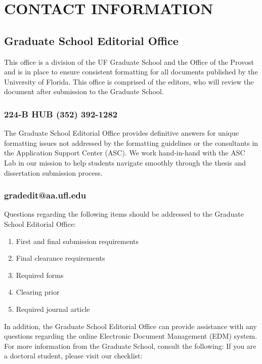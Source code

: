 \chapter{CONTACT INFORMATION}%

\section{Graduate School Editorial Office}%
This office is a division of the UF Graduate School and the Office of the Provost and is in place to ensure consistent formatting for all documents published by the University of Florida. This office is comprised of the editors, who will review the document after submission to the Graduate School. \cite{Bailey}
\subsection{224-B HUB (352) 392-1282}
The Graduate School Editorial Office provides definitive answers for unique formatting issues not addressed by the formatting guidelines or the consultants in the Application Support Center (ASC). We work hand-in-hand with the ASC Lab in our mission to help students navigate smoothly through the thesis and dissertation submission process. 
\subsection{gradedit@aa.ufl.edu}
Questions regarding the following items should be addressed to the Graduate School Editorial Office: \cite{ahal:2005,dici:1989b,datt:1995}

   \begin{enumerate}
   \item First and final submission requirements \vspace{-10 pt}
   \item Final clearance requirements \vspace{-10 pt}
   \item Required forms \vspace{-10 pt}
   \item Clearing prior \vspace{-10 pt}
   \item Required journal article
   \end{enumerate}

In addition, the Graduate School Editorial Office can provide assistance with any questions regarding the online Electronic Document Management (EDM) system. For more information from the Graduate School, consult the following: If you are a doctoral student, please visit our checklist:

